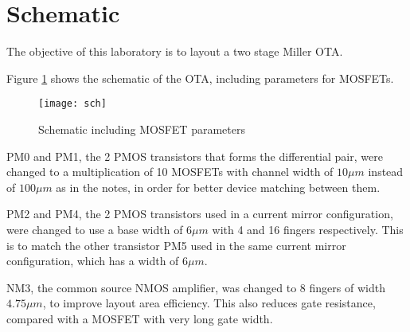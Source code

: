 \section{Schematic}

The objective of this laboratory is to layout a two stage Miller OTA.

Figure \ref{fig:sch} shows the schematic of the OTA, including parameters for MOSFETs.

\begin{figure}[!htb]
	\centering
	\texttt{[image: sch]}
	\caption{Schematic including MOSFET parameters}
	\label{fig:sch}
\end{figure}

PM0 and PM1, the 2 PMOS transistors that forms the differential pair, were changed to a multiplication of 10 MOSFETs with channel width of $10 \mu m$ instead of $100 \mu m$ as in the notes, in order for better device matching between them.

PM2 and PM4, the 2 PMOS transistors used in a current mirror configuration, were changed to use a base width of $6 \mu m$ with 4 and 16 fingers respectively. This is to match the other transistor PM5 used in the same current mirror configuration, which has a width of $6 \mu m$.

NM3, the common source NMOS amplifier, was changed to 8 fingers of width $4.75 \mu m$, to improve layout area efficiency. This also reduces gate resistance, compared with a MOSFET with very long gate width.
